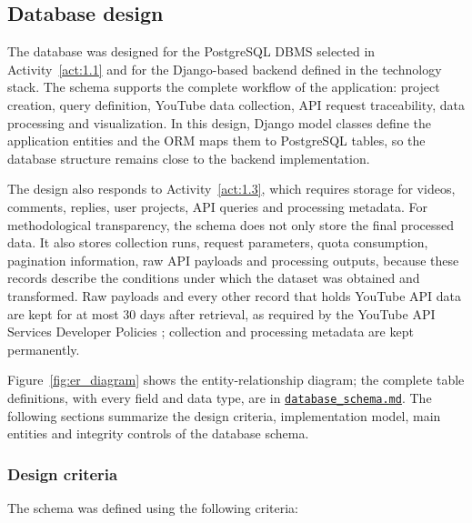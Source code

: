 \subsection{Database design}

The database was designed for the PostgreSQL DBMS selected in Activity~\ref{act:1.1} and for the Django-based backend defined in the technology stack. The schema supports the complete workflow of the application: project creation, query definition, YouTube data collection, API request traceability, data processing and visualization. In this design, Django model classes define the application entities and the ORM maps them to PostgreSQL tables, so the database structure remains close to the backend implementation.

The design also responds to Activity~\ref{act:1.3}, which requires storage for videos, comments, replies, user projects, API queries and processing metadata. For methodological transparency, the schema does not only store the final processed data. It also stores collection runs, request parameters, quota consumption, pagination information, raw API payloads and processing outputs, because these records describe the conditions under which the dataset was obtained and transformed. Raw payloads and every other record that holds YouTube API data are kept for at most 30 days after retrieval, as required by the YouTube API Services Developer Policies \autocite{youtube_api_services_developer_policies}; collection and processing metadata are kept permanently.

Figure~\ref{fig:er_diagram} shows the entity-relationship diagram; the complete table definitions, with every field and data type, are in \href{https://github.com/LONG-TERM-EFFECTS-OF-SUFFERING/thesis/tree/main/docs/database_schema.md}{\texttt{database\_schema.md}}. The following sections summarize the design criteria, implementation model, main entities and integrity controls of the database schema.

\subsubsection{Design criteria}

The schema was defined using the following criteria:

